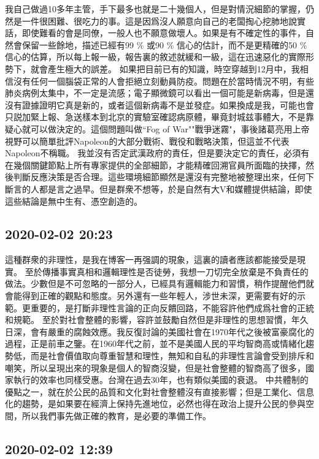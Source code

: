 \documentclass[twocolumn]{ctexart}
\begin{document}
我自己做過10多年主管，手下最多也就是二十幾個人，但是對情況細節的掌握，仍然是一件很困難、很吃力的事。這是因爲沒人願意向自己的老闆掏心挖肺地說實話，即使難看的會是同僚，一般人也不願意做壞人。如果是有不確定性的事件，自然會保留一些餘地，描述已經有99 \% 或90 \% 信心的估計，而不是更精確的50 \% 信心的估算，所以每上報一級，報告裏的敘述就緩和一級，這在迅速惡化的實際形勢下，就會產生極大的誤差。
如果把目前已有的知識，時空穿越到12月中，我相信沒有任何一個腦袋正常的人會拒絕立刻動員防疫。問題在於當時情況不明，有些肺炎病例太集中，不一定是流感；電子顯微鏡可以看出一個可能是新病毒，但是還沒有證據證明它真是新的，或者這個新病毒不是並發症。如果換成是我，可能也會只説加緊上報、急送樣本到北京的實驗室確認病原體，畢竟封城兹事體大，不是靠疑心就可以做決定的。這個問題叫做“Fog of War""戰爭迷霧"，事後諸葛亮用上帝視野可以簡單批評Napoleon的大部分戰術、戰役和戰略決策，但這並不代表Napoleon不稱職。
我並沒有否定武漢政府的責任，但是要決定它的責任，必須有在幾個關鍵節點上所有專家提供的全部細節，才能精確回溯官員所面臨的抉擇，然後判斷反應決策是否合理。這些環境細節顯然是還沒有完整地被整理出來，任何下斷言的人都是言之過早。但是群衆不想等，於是自然有大V和媒體提供結論，即使這些結論是無中生有、憑空創造的。
\subsection*{2020-02-02 20:23}

這種群衆的非理性，是我在博客一再强調的現象，這裏的讀者應該都能接受是現實。
至於傳播事實真相和邏輯理性是否徒勞，我想一刀切完全放棄是不負責任的做法。少數但是不可忽略的一部分人，已經具有邏輯能力和習慣，稍作提醒他們就會能得到正確的觀點和態度。另外還有一些年輕人，涉世未深，更需要有好的示範。更重要的，是打斷非理性言論的正向反饋回路，不能容許他們成爲社會的正統和規範。
至於對社會整體的影響，容許並鼓勵自然但是非理性的思想習慣，年久日深，會有嚴重的腐蝕效應。我反復討論的美國社會在1970年代之後被富豪腐化的過程，正是前車之鑒。在1960年代之前，並不是美國人民的平均智商高或情緒化趨勢低，而是社會價值取向尊重智慧和理性，無知和自私的非理性言論會受到排斥和嘲笑，所以呈現出來的現象是個人的智商沒變，但是社會整體的智商高了很多，國家執行的效率也同樣受惠。台灣在過去30年，也有類似美國的衰退。
中共體制的優點之一，就在於公民的品質和文化對社會整體沒有直接影響；但是工業化、信息化的趨勢，是如果要在經濟上保持先進地位，必然也得在政治上提升公民的參與空間，所以我們事先做正確的教育，是必要的準備工作。
\subsection*{2020-02-02 12:39}
\end{document}
